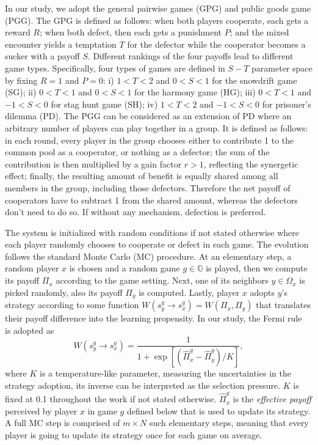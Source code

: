 \documentclass[showpacs,superscriptaddress,reprint,nofootinbib,amsmath,amssymb,aps,pre]{revtex4-1}
\begin{document}
In our study, we adopt the general pairwise games (GPG) and public goods game (PGG). 
The GPG is defined as follows: when both players cooperate, each gets a reward $R$; when both defect, then each gets a punishment $P$; and the mixed encounter yields a temptation $T$ for the defector while the cooperator becomes a sucker with a payoff $S$. Different rankings of the four payoffs lead to different game types. Specifically, four types of games are defined in $S-T$ parameter space by fixing $R\!=\!1$ and $P\!=\!0$: i) $1<T<2$ and $0<S<1$ for the snowdrift game (SG); ii) $0<T<1$ and $0<S<1$ for the harmony game (HG); iii) $0<T<1$ and $-1<S<0$ for stag hunt game (SH); iv) $1<T<2$ and $-1<S<0$ for prisoner's dilemma (PD). The PGG can be considered as an extension of PD where an arbitrary number of players can play together in a group. It is defined as follows: in each round, every player in the group chooses either to contribute 1 to the common pool as a cooperator, or nothing as a defector; the sum of the contribution is then multiplied by a gain factor $r>1$, reflecting the synergetic effect; finally, the resulting amount of benefit is equally shared among all members in the group, including those defectors. Therefore the net payoff of cooperators have to subtract 1 from the shared amount, whereas the defectors don't need to do so. If without any mechanism, defection is preferred.

The system is initialized with random conditions if not stated otherwise where each player randomly chooses to cooperate or defect in each game. The evolution follows the standard Monte Carlo (MC) procedure. At an elementary step, a random player $x$ is chosen and a random game $g\in \mathbb{G}$ is played, then we compute its payoff $\Pi_x$ according to the game setting. Next, one of its neighbors $y\in\Omega_x$ is picked randomly, also its payoff $\Pi_y$ is computed. Lastly,  player $x$ adopts $y$'s strategy according to some function $W(s^g_y\rightarrow s^g_x)=W(\Pi_x,\Pi_y)$ that translates their payoff difference into the learning propensity. In our study, the Fermi rule~\cite{szabo1998evolutionary} is adopted as 
\begin{equation}
W(s_y^g\rightarrow s_x^g)=\frac{1}{1+\exp[(\widehat{\Pi}_x^g-\widehat{\Pi}_y^g)/K]} ,
\label{eq:fermi}
\end{equation}
where $K$ is a temperature-like parameter, measuring the uncertainties in the strategy adoption, its inverse can be interpreted as the selection pressure. $K$ is fixed at 0.1 throughout the work if not stated otherwise. $\widehat{\Pi}_x^g$ is the \emph{effective payoff} perceived by player $x$ in game $g$ defined below that is used to update its strategy. A full MC step is comprised of $m\times N$ such elementary steps, meaning that every player is going to update its strategy once for each game on average.
\end{document}
